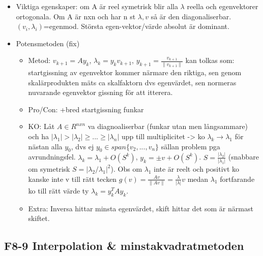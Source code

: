 \documentclass[a4paper]{article}
\begin{document}
\begin{itemize}
\begin{itemize}
            \item Viktiga egenskaper: om A är reel symetrisk blir alla $\lambda$ reella och egenvektorer ortogonala. Om A är nxn och har n st $\lambda, v$ så är den diagonaliserbar. $(v_i, \lambda_i)$=egenmod. Största egen-vektor/värde absolut är dominant.
            \item Potensmetoden (fix)
            \begin{itemize}
                \item Metod: $v_{k+1}=Ay_k$, $\lambda_k=y_k v_{k+1}$, $y_{k+1}=\frac{v_{k+1}}{\|v_{k+1}\|}$ kan tolkas som: startgissning av egenvektor kommer närmare den riktiga, sen genom skalärprodukten mäts ca skalfaktorn dvs egenvärdet, sen normeras nuvarande egenvektor gissning för att itterera.
                \item Pro/Con: +bred startgissning funkar
                \item KO: Låt $A\in R^{nxn}$ va diagnoaliserbar (funkar utan men långsammare) och ha $|\lambda_1|>|\lambda_2|\geq ... \geq |\lambda_n|$ upp till multiplicitet -> ko $\lambda_k\to \lambda_1$ för nästan alla $y_0$, dvs ej $y_0\in span\{v_2, ..., v_n\}$ sällan problem pga avrundningsfel. $\lambda_k=\lambda_1+O(S^k)$, $y_k=\pm v+O(S^k)$. $S=\frac{|\lambda_2|}{|\lambda_1|}$ (snabbare om symetrisk $S=|\lambda_2/\lambda_1|^2$). Obs om $\lambda_1$ inte är reelt och positivt ko kanske inte v till rätt tecken $g(v)=\frac{Av}{\|Av\|}=\frac{\lambda}{|\lambda|}v$ medan $\lambda_1$ fortfarande ko till rätt värde ty $\lambda_k=y_k^TAy_k$. 
                \item Extra: Inversa hittar minsta egenvärdet, skift hittar det som är närmast skiftet.
            \end{itemize}
        \end{itemize}
\end{itemize}

\subsection{F8-9 Interpolation \& minstakvadratmetoden}
\end{document}
